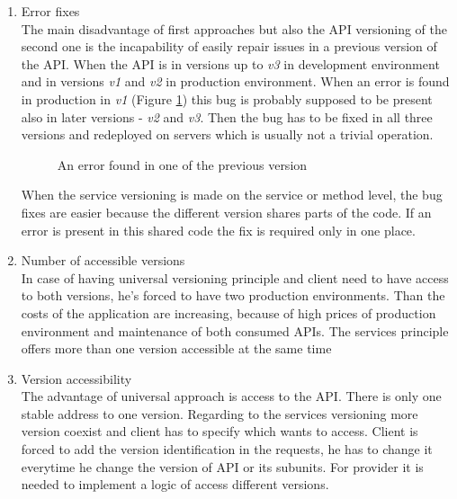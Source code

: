 \begin{enumerate}
  \item {Error fixes} \\
The main disadvantage of first approaches but also the API versioning of the second one is the incapability of easily repair issues in a previous version of the API. When the API is in versions up to \emph{v3} in development environment and in versions \emph{v1} and \emph{v2} in production environment. When an error is found in production in \emph{v1} (Figure \ref{fig:bug-in-previous-version}) this bug is probably supposed to be present also in later versions - \emph{v2} and \emph{v3}. Then the bug has to be fixed in all three versions and redeployed on servers which is usually not a trivial operation.
\begin{figure}[htp] 
\caption{An error found in one of the previous version}
\label{fig:bug-in-previous-version}
\end{figure} 

When the service versioning is made on the service or method level, the bug fixes are easier because the different version shares parts of the code. If an error is present in this shared code the fix is required only in one place.


\item{Number of accessible versions} \\
In case of having universal versioning principle and client need to have access to both versions, he's forced to have two production environments. Than the costs of the application are increasing, because of high prices of production environment and maintenance of both consumed APIs. The services principle offers more than one version accessible at the same time


\item{Version accessibility} \\
The advantage of universal approach is access to the API. There is only one stable address to one version. Regarding to the services versioning more version coexist and client has to specify which wants to access. Client is forced to add the version identification in the requests, he has to change it everytime he change the version of API or its subunits. For provider it is needed to implement a logic of access different versions.

\end{enumerate}




